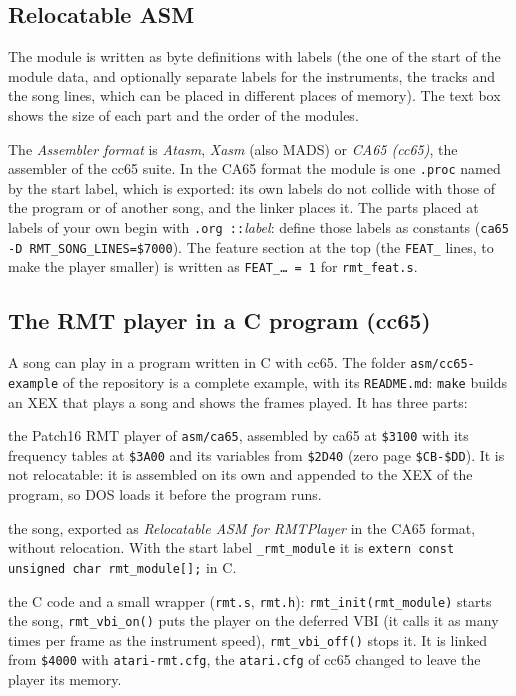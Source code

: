 \subsection{Relocatable ASM}


The module is written as byte definitions with labels (the one of the start of the module data, and optionally separate labels for the
instruments, the tracks and the song lines, which can be placed in different places of memory). The text box shows the size of each
part and the order of the modules.

The \emph{Assembler format} is \emph{Atasm}, \emph{Xasm} (also MADS) or \emph{CA65 (cc65)}, the assembler of the cc65 suite.
In the CA65 format the module is one \texttt{.proc} named by the start label, which is exported: its own labels do not collide
with those of the program or of another song, and the linker places it. The parts placed at labels of your own begin with
\texttt{.org ::}\emph{label}: define those labels as constants (\texttt{ca65 -D RMT\_SONG\_LINES=\$7000}). The feature section at the
top (the \texttt{FEAT\_} lines, to make the player smaller) is written as \texttt{FEAT\_\ldots{} = 1} for \texttt{rmt\_feat.s}.

\subsection{The RMT player in a C program (cc65)}\label{sec:cc65}

A song can play in a program written in C with cc65. The folder \texttt{asm/cc65-example} of the repository is a complete
example, with its \texttt{README.md}: \texttt{make} builds an XEX that plays a song and shows the frames played. It has three
parts:

\begin{description}[style=nextline,leftmargin=1.2cm]
  \item[The player] the Patch16 RMT player of \texttt{asm/ca65}, assembled by ca65 at \texttt{\$3100} with its frequency tables at
        \texttt{\$3A00} and its variables from \texttt{\$2D40} (zero page \texttt{\$CB-\$DD}). It is not relocatable: it is assembled
        on its own and appended to the XEX of the program, so DOS loads it before the program runs.
  \item[The module] the song, exported as \emph{Relocatable ASM for RMTPlayer} in the CA65 format, without relocation. With the start
        label \texttt{\_rmt\_module} it is \texttt{extern const unsigned char rmt\_module[];} in C.
  \item[The program] the C code and a small wrapper (\texttt{rmt.s}, \texttt{rmt.h}): \texttt{rmt\_init(rmt\_module)} starts the song,
        \texttt{rmt\_vbi\_on()} puts the player on the deferred VBI (it calls it as many times per frame as the instrument speed),
        \texttt{rmt\_vbi\_off()} stops it. It is linked from \texttt{\$4000} with \texttt{atari-rmt.cfg}, the \texttt{atari.cfg} of cc65
        changed to leave the player its memory.
\end{description}

